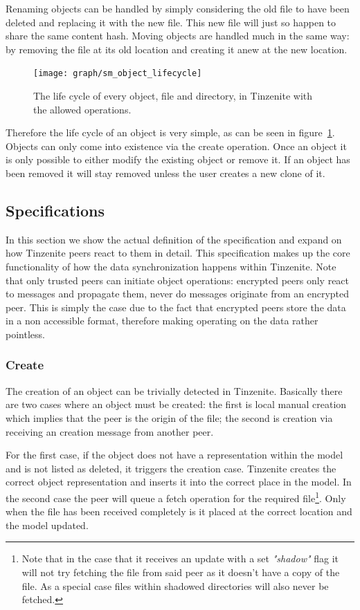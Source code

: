 Renaming objects can be handled by simply considering the old file to have been deleted and replacing it with the new file.
This new file will just so happen to share the same content hash.
Moving objects are handled much in the same way: by removing the file at its old location and creating it anew at the new location.

\begin{figure}[htp]
\centering
    \texttt{[image: graph/sm\_object\_lifecycle]}
\caption[Object State Diagram]{The life cycle of every object, file and directory, in Tinzenite with the allowed operations.}
\label{diagram:object_operations}
\end{figure}

Therefore the life cycle of an object is very simple, as can be seen in figure~\ref{diagram:object_operations}.
Objects can only come into existence via the create operation.
Once an object it is only possible to either modify the existing object or remove it.
If an object has been removed it will stay removed unless the user creates a new clone of it.

\subsection{Specifications}
\label{sub:Specifications}

In this section we show the actual definition of the specification and expand on how Tinzenite peers react to them in detail.
This specification makes up the core functionality of how the data synchronization happens within Tinzenite.
Note that only trusted peers can initiate object operations: encrypted peers only react to messages and propagate them, never do messages originate from an encrypted peer.
This is simply the case due to the fact that encrypted peers store the data in a non accessible format, therefore making operating on the data rather pointless.

\subsubsection{Create}
\label{subs:Create}

The creation of an object can be trivially detected in Tinzenite.
Basically there are two cases where an object must be created: the first is local manual creation which implies that the peer is the origin of the file; the second is creation via receiving an creation message from another peer.

For the first case, if the object does not have a representation within the model and is not listed as deleted, it triggers the creation case.
Tinzenite creates the correct object representation and inserts it into the correct place in the model.
In the second case the peer will queue a fetch operation for the required file\footnote{Note that in the case that it receives an update with a set \textit{"shadow"} flag it will not try fetching the file from said peer as it doesn't have a copy of the file. As a special case files within shadowed directories will also never be fetched.}.
Only when the file has been received completely is it placed at the correct location and the model updated.

